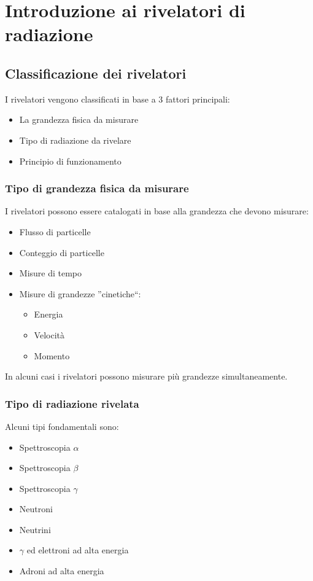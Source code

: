 \chapter{Introduzione ai rivelatori di radiazione}
\section{Classificazione dei rivelatori}
I rivelatori vengono classificati in base a 3 fattori principali:
\begin{itemize}
\item La grandezza fisica da misurare
\item Tipo di radiazione da rivelare
\item Principio di funzionamento
\end{itemize}
\subsection{Tipo di grandezza fisica da misurare}
I rivelatori possono essere catalogati in base alla grandezza che devono misurare:
\begin{itemize}
\item Flusso di particelle
\item Conteggio di particelle
\item Misure di tempo
\item Misure di grandezze ''cinetiche``:
\begin{itemize}
\item Energia
\item Velocit\`a
\item Momento
\end{itemize}
\end{itemize}
In alcuni casi i rivelatori possono misurare pi\`u grandezze simultaneamente.
\subsection{Tipo di radiazione rivelata}
Alcuni tipi fondamentali sono:
\begin{itemize}
\item Spettroscopia $\alpha$
\item Spettroscopia $\beta$
\item Spettroscopia $\gamma$
\item Neutroni
\item Neutrini
\item $\gamma$ ed elettroni ad alta energia
\item Adroni ad alta energia
\end{itemize}
